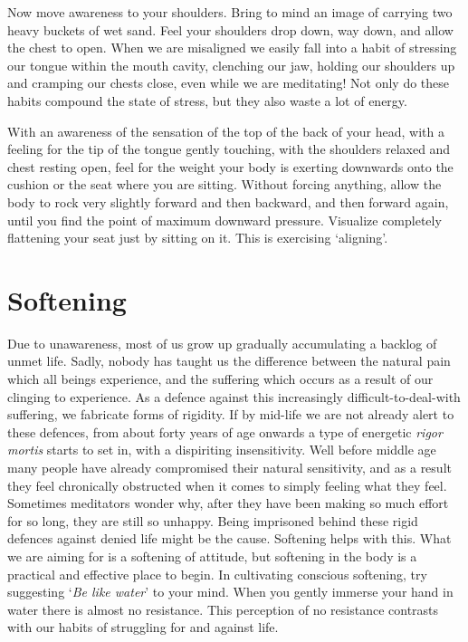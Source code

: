 Now move awareness to your shoulders. Bring to mind an image of carrying
two heavy buckets of wet sand. Feel your shoulders drop down, way down,
and allow the chest to open. When we are misaligned we easily fall into
a habit of stressing our tongue within the mouth cavity, clenching our
jaw, holding our shoulders up and cramping our chests close, even while
we are meditating! Not only do these habits compound the state of
stress, but they also waste a lot of energy.

With an awareness of the sensation of the top of the back of your head,
with a feeling for the tip of the tongue gently touching, with the
shoulders relaxed and chest resting open, feel for the weight your body
is exerting downwards onto the cushion or the seat where you are
sitting. Without forcing anything, allow the body to rock very slightly
forward and then backward, and then forward again, until you find the
point of maximum downward pressure. Visualize completely flattening your
seat just by sitting on it. This is exercising `aligning'.

\section{Softening}

Due to unawareness, most of us grow up gradually accumulating a backlog
of unmet life. Sadly, nobody has taught us the difference between the
natural pain which all beings experience, and the suffering which occurs
as a result of our clinging to experience. As a defence against this
increasingly difficult-to-deal-with suffering, we fabricate forms of
rigidity. If by mid-life we are not already alert to these defences,
from about forty years of age onwards a type of energetic \emph{rigor
mortis} starts to set in, with a dispiriting insensitivity. Well before
middle age many people have already compromised their natural
sensitivity, and as a result they feel chronically obstructed when it
comes to simply feeling what they feel. Sometimes meditators wonder why,
after they have been making so much effort for so long, they are still
so unhappy. Being imprisoned behind these rigid defences against denied
life might be the cause. Softening helps with this. What we are aiming
for is a softening of attitude, but softening in the body is a practical
and effective place to begin. In cultivating conscious softening, try
suggesting `\emph{Be like water}' to your mind. When you gently immerse
your hand in water there is almost no resistance. This perception of no
resistance contrasts with our habits of struggling for and against life.

